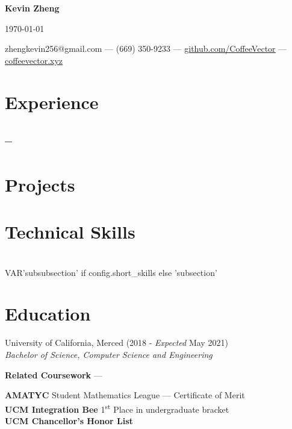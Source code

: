 \documentclass[letterpaper,12pt]{article}
\makeatletter
\newcommand\textbox[1]{%
    \parbox{.333\textwidth}{#1}%
}
\renewcommand{\maketitle}{
    \begin{center}
        \noindent\textbox{\hfill}\textbox{\hfil\bfseries\huge Kevin Zheng\hfil}\textbox{\hfill \today}
        {\faEnvelope \enskip zhengkevin256@gmail.com --- \faPhone \enskip (669) 350-9233 --- \faGithub \enskip \underline{\color{blue}\href{https://github.com/CoffeeVector}{github.com/CoffeeVector}} --- \faChain \enskip \underline{\color{blue}\href{https://coffeevector.xyz}{coffeevector.xyz}}}
    \end{center} }
\makeatother
\begin{document}
\maketitle
\section{Experience}
    \subsection{ -- \null\hfill {}}
    \vspace*{-2mm}
\section{Projects}
    \subsection{\null\hfill {}}
    \vspace*{-2mm}
\section{Technical Skills}
    \\VAR{'subsubsection' if config.short_skills else 'subsection' }{}
    \vspace*{-4mm}
\section{Education}
    University of California, Merced\null\hfill {} (2018 - \emph{Expected} May 2021)\\
    \emph{Bachelor of Science, Computer Science and Engineering}
    \begin{center}
        \textbf{Related Coursework} --- 
    \end{center}
    \textbf{AMATYC} Student Mathematics League --- Certificate of Merit\\
    \textbf{UCM Integration Bee} 1\textsuperscript{st} Place in undergraduate bracket\\
    \textbf{UCM Chancellor's Honor List}
\end{document}
